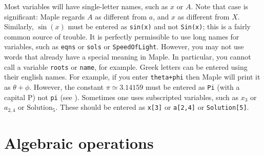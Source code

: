 \documentclass{amsart}
\begin{document}
\begin{itemize}
  Most variables will have single-letter
  names, such as $x$ or $A$. 
%
   Note that case is significant: Maple regards
  $A$ as different from $a$, and $x$ as different from $X$. 
  Similarly, $\sin(x)$ must be entered as \verb~sin(x)~ and
  not \verb~Sin(x)~; this is a fairly common source of
  trouble. 
%
   It is perfectly permissible to use long
  names for variables, such as \verb~eqns~ or \verb~sols~ or
  \verb~SpeedOfLight~. 
%
   However, you may not use words that
  already have a special meaning in Maple.  In particular,
  you cannot call a variable \verb~roots~ or \verb~name~,
  for example. 
%
   Greek letters can be entered using
  their english names.  For example, if you enter
  \verb~theta+phi~ then Maple will print it as
  $\theta+\phi$.  However, the constant
  $\pi\simeq 3.14159$ must be entered as \verb~Pi~ (with a
  capital P) not \verb~pi~ (see \NOTEbadpi). 
%
   Sometimes one uses subscripted
  variables, such as $x_3$ or $a_{2,4}$ or
  $\text{Solution}_5$.  These should be entered as
  \verb~x[3]~ or \verb~a[2,4]~ or \verb~Solution[5]~. 
\end{itemize}

\section{Algebraic operations}
\setcounter{notecounter}{0}
\end{document}
